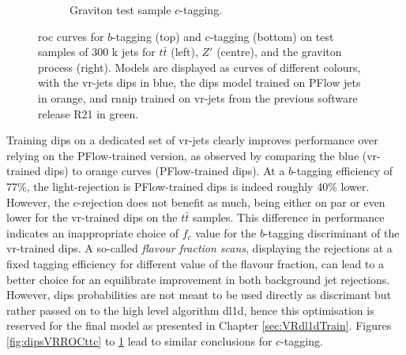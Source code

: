 \begin{figure}
\begin{subfigure}[t]{0.3\textwidth}
    \caption{Graviton test sample $c$-tagging.}
    \label{fig:dipsVRROCgrc}
  \end{subfigure}
  \caption{\gls{roc} curves for $b$-tagging (top) and $c$-tagging (bottom) on test samples of 300 k jets for $t\bar{t}$ (left), $Z'$ (centre), and the graviton process (right). Models are displayed as curves of different colours, with the \gls{vr}-jets \gls{dips} in blue, the \gls{dips} model trained on PFlow jets in orange, and \gls{rnnip} trained on \gls{vr}-jets from the previous software release R21 in green.}
  \label{fig:dipsVRROC}
\end{figure}

Training \gls{dips} on a dedicated set of \gls{vr}-jets clearly improves performance over relying on the PFlow-trained version, as observed by comparing the blue (\gls{vr}-trained \gls{dips}) to orange curves (PFlow-trained \gls{dips}). At a $b$-tagging efficiency of 77\%, the light-rejection is PFlow-trained \gls{dips} is indeed roughly 40\% lower. However, the $c$-rejection does not benefit as much, being either on par or even lower for the \gls{vr}-trained \gls{dips} on the $t\bar{t}$ samples. This difference in performance indicates an inappropriate choice of $f_c$ value for the $b$-tagging discriminant of the \gls{vr}-trained \gls{dips}. A so-called \textit{flavour fraction scans}, displaying the rejections at a fixed tagging efficiency for different value of the flavour fraction, can lead to a better choice for an equilibrate improvement in both background jet rejections. However, \gls{dips} probabilities are not meant to be used directly as discrimant but rather passed on to the high level algorithm \gls{dl1d}, hence this optimisation is reserved for the final model as presented in Chapter \ref{sec:VRdl1dTrain}. Figures \ref{fig:dipsVRROCttc} to \ref{fig:dipsVRROCgrc} lead to similar conclusions for $c$-tagging.

\clearpage

